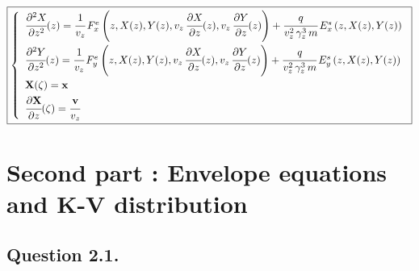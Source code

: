 \documentclass[10pt]{article}
\newcommand{\D}{{\partial}}
\begin{document}
$$\boxed{
\left\lbrace
    \begin{array}{ll}
\cfrac{\D^2 X}{\D z^2}(z) = \cfrac{1}{v_{z}}\,F^e_x \left(z,X(z),Y(z),v_z\,\cfrac{\D X}{\D z}(z),v_z\,\cfrac{\D Y}{\D z}(z)\right) + \cfrac{q}{v_{z}^2\,\gamma_{z}^{3}\,m}\, E^s_x\left(z,X(z),Y(z)\right) \vspace{1mm}\\
\cfrac{\D^2 Y}{\D z^2}(z) = \cfrac{1}{v_{z}}\,F^e_y \left(z,X(z),Y(z),v_z\,\cfrac{\D X}{\D z}(z),v_z\,\cfrac{\D Y}{\D z}(z)\right) + \cfrac{q}{v_{z}^2\,\gamma_{z}^{3}\,m}\, E^s_y\left(z,X(z),Y(z)\right) \vspace{1mm}\\
\mathbf{X}(\zeta) = \mathbf{x} \vspace{1mm}\\
\cfrac{\D \mathbf{X}}{\D z}(\zeta) = \cfrac{\mathbf{v}}{v_z}
    \end{array}
\right.}
$$



\newpage

\section{Second part : Envelope equations and K-V distribution}

\subsection{Question 2.1.}
\end{document}
